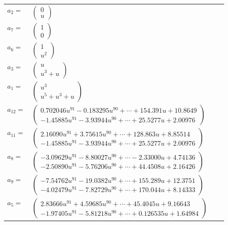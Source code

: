 \documentclass[1p]{elsarticle_modified}
\theoremstyle{definition}
\begin{document}
\begin{tabular}{m{7pt} m{180pt} m{7pt} m{180pt} }
\flushright $a_{2}=$&$\begin{pmatrix}0\\u\end{pmatrix}$ \\
\flushright $a_{7}=$&$\begin{pmatrix}1\\0\end{pmatrix}$ \\
\flushright $a_{6}=$&$\begin{pmatrix}1\\u^2\end{pmatrix}$ \\
\flushright $a_{3}=$&$\begin{pmatrix}u\\u^3+u\end{pmatrix}$ \\
\flushright $a_{1}=$&$\begin{pmatrix}u^3\\u^5+u^3+u\end{pmatrix}$ \\
\flushright $a_{12}=$&$\begin{pmatrix}0.702046 u^{91}-0.183295 u^{90}+\cdots+154.391 u+10.8649\\-1.45885 u^{91}-3.93944 u^{90}+\cdots+25.5277 u+2.00976\end{pmatrix}$ \\
\flushright $a_{11}=$&$\begin{pmatrix}2.16090 u^{91}+3.75615 u^{90}+\cdots+128.863 u+8.85514\\-1.45885 u^{91}-3.93944 u^{90}+\cdots+25.5277 u+2.00976\end{pmatrix}$ \\
\flushright $a_{8}=$&$\begin{pmatrix}-3.09629 u^{91}-8.80027 u^{90}+\cdots-2.33000 u+4.74136\\-2.50890 u^{91}-5.76206 u^{90}+\cdots+44.4508 u+2.16426\end{pmatrix}$ \\
\flushright $a_{9}=$&$\begin{pmatrix}-7.54762 u^{91}-19.0382 u^{90}+\cdots+155.289 u+12.3751\\-4.02479 u^{91}-7.82729 u^{90}+\cdots+170.044 u+8.14333\end{pmatrix}$ \\
\flushright $a_{5}=$&$\begin{pmatrix}2.83666 u^{91}+4.59685 u^{90}+\cdots+45.4045 u+9.16643\\-1.97405 u^{91}-5.81218 u^{90}+\cdots+0.126535 u+1.64984\end{pmatrix}$ \\

\end{tabular}
\end{document}
